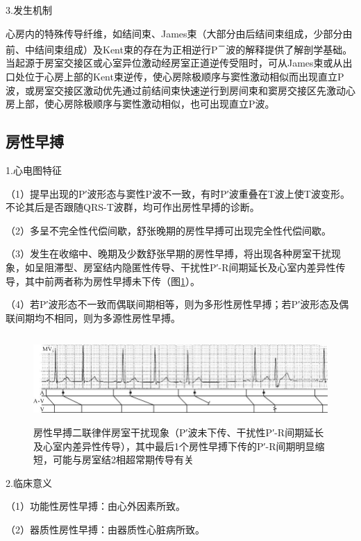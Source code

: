 3.发生机制

心房内的特殊传导纤维，如结间束、James束（大部分由后结间束组成，少部分由前、中结间束组成）及Kent束的存在为正相逆行P\textsuperscript{－}波的解释提供了解剖学基础。当起源于房室交接区或心室异位激动经房室正道逆传受阻时，可从James束或从出口处位于心房上部的Kent束逆传，使心房除极顺序与窦性激动相似而出现直立P波，或房室交接区激动优先通过前结间束快速逆行到房间束和窦房交接区先激动心房上部，使心房除极顺序与窦性激动相似，也可出现直立P波。

\protect\hypertarget{text00007.htmlux5cux23subid22}{}{}

\subsection{房性早搏}

1.心电图特征

（1）提早出现的P′波形态与窦性P波不一致，有时P′波重叠在T波上使T波变形。不论其后是否跟随QRS-T波群，均可作出房性早搏的诊断。

（2）多呈不完全性代偿间歇，舒张晚期的房性早搏可出现完全性代偿间歇。

（3）发生在收缩中、晚期及少数舒张早期的房性早搏，将出现各种房室干扰现象，如呈阻滞型、房室结内隐匿性传导、干扰性P′-R间期延长及心室内差异性传导，其中前两者称为房性早搏未下传（图\ref{fig1-25}）。

（4）若P′波形态不一致而偶联间期相等，则为多形性房性早搏；若P′波形态及偶联间期均不相同，则为多源性房性早搏。

\begin{figure}[!htbp]
 \centering
 \includegraphics[width=5.73958in,height=1.32292in]{./images/Image00031.jpg}
 \captionsetup{justification=centering}
 \caption{房性早搏二联律伴房室干扰现象（P′波未下传、干扰性P′-R间期延长及心室内差异性传导），其中最后1个房性早搏下传的P′-R间期明显缩短，可能与房室结2相超常期传导有关}
 \label{fig1-25}
  \end{figure} 

2.临床意义

（1）功能性房性早搏：由心外因素所致。

（2）器质性房性早搏：由器质性心脏病所致。


